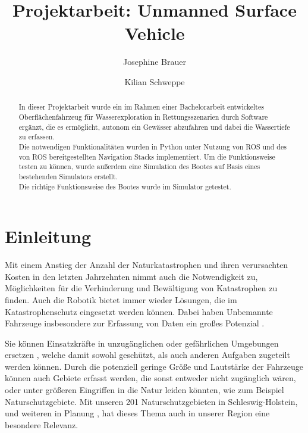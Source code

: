 \documentclass[11pt]{article}
\begin{document}
\title{Projektarbeit: Unmanned Surface Vehicle}

\author{Josephine Brauer \and Kilian Schweppe}

\maketitle

\begin{abstract}
In dieser Projektarbeit wurde ein im Rahmen einer Bachelorarbeit entwickeltes Oberflächenfahrzeug für Wasserexploration in Rettungsszenarien durch Software ergänzt, die es ermöglicht, autonom ein Gewässer abzufahren und dabei die Wassertiefe zu erfassen.\\
Die notwendigen Funktionalitäten wurden in Python unter Nutzung von ROS und des von ROS bereitgestellten Navigation Stacks implementiert. Um die Funktionsweise testen zu können, wurde außerdem eine Simulation des Bootes auf Basis eines bestehenden Simulators erstellt.\\
Die richtige Funktionsweise des Bootes wurde im Simulator getestet.
\end{abstract}

\section{Einleitung}
Mit einem Anstieg der Anzahl der Naturkatastrophen und ihren verursachten Kosten in den letzten Jahrzehnten\cite{kellenberg} nimmt auch die Notwendigkeit zu, Möglichkeiten für die Verhinderung und Bewältigung von Katastrophen zu finden. Auch die Robotik bietet immer wieder Lösungen, die im Katastrophenschutz eingesetzt werden können. Dabei haben Unbemannte Fahrzeuge insbesondere zur Erfassung von Daten ein großes Potenzial \cite{surveyDisasterRobotics}.

Sie können Einsatzkräfte in unzugänglichen oder gefährlichen Umgebungen ersetzen \cite{bellingham}, welche damit sowohl geschützt, als auch anderen Aufgaben zugeteilt werden können. Durch die potenziell geringe Größe und Lautstärke der Fahrzeuge können auch Gebiete erfasst werden, die sonst entweder nicht zugänglich wären, oder unter größeren Eingriffen in die Natur leiden könnten, wie zum Beispiel Naturschutzgebiete. Mit unseren 201 Naturschutzgebieten in Schleswig-Holstein, und weiteren in Planung \cite{Naturschutz}, hat dieses Thema auch in unserer Region eine besondere Relevanz.
\end{document}
